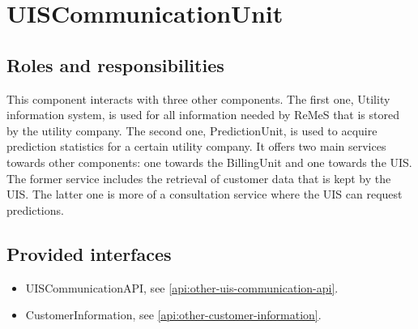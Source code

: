 \section{UISCommunicationUnit}
\label{element:uis-communication-unit}

\subsection{Roles and responsibilities}

\npar This component interacts with three other components. The first one,
Utility information system, is used for all information needed by ReMeS that is
stored by the utility company. The second one, PredictionUnit, is used to
acquire prediction statistics for a certain utility company. It offers two main
services towards other components: one towards the BillingUnit
and one towards the UIS. The former service includes the retrieval
of customer data that is kept by the UIS. The latter one is more of a
consultation service where the UIS can request predictions.

\subsection{Provided interfaces}

\begin{itemize}
  \item UISCommunicationAPI, see \ref{api:other-uis-communication-api}.
  \item CustomerInformation, see \ref{api:other-customer-information}.
\end{itemize}